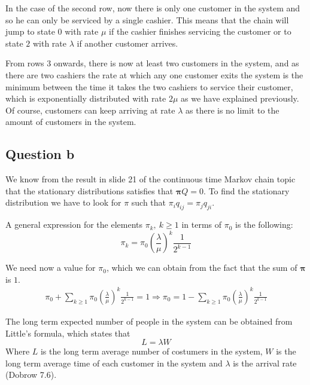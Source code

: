 \documentclass[11pt, a4paper]{article}
\begin{document}
In the case of the second row, now there is only one customer in the system and so he can only be serviced by a single cashier. This means that the chain will jump to state $0$ with rate $\mu$ if the cashier finishes servicing the customer or to state $2$ with rate $\lambda$ if another customer arrives.

From rows $3$ onwards, there is now at least two customers in the system, and as there are two cashiers the rate at which any one customer exits the system is the minimum between the time it takes the two cashiers to service their customer, which is exponentially distributed with rate $2\mu$ as we have explained previously.
Of course, customers can keep arriving at rate $\lambda$ as there is no limit to the amount of customers in the system.

\subsection*{Question b}
We know from the result in slide 21 of the continuous time Markov chain topic that the stationary distributions satisfies that $\bm{\pi}Q = 0$.
To find the stationary distribution we have to look for $\pi$ such that $\pi_i q_{ij} = \pi_j q_{ji}$.

A general expression for the elements $\pi_k, \ k\geq 1$ in terms of $\pi_0$ is the following:
\[
	\pi_k = \pi_0\left(\frac{\lambda}{\mu}\right)^k \frac{1}{2^{k-1}}
\]

We need now a value for $\pi_0$, which we can obtain from the fact that the sum of $\bm{\pi}$ is $1$.
\begin{align*}
	\pi_0 + \sum_{k \geq 1}	\pi_0\left(\frac{\lambda}{\mu}\right)^k \frac{1}{2^{k-1}} = 1 \Rightarrow \pi_0 = 1 - \sum_{k \geq 1}	\pi_0\left(\frac{\lambda}{\mu}\right)^k \frac{1}{2^{k-1}}
\end{align*}

The long term expected number of people in the system can be obtained from Little's formula, which states that 
\[
	L = \lambda W
\]
Where $L$ is the long term average number of costumers in the system, $W$ is the long term average time of each customer in the system and $\lambda$ is the arrival rate (Dobrow 7.6).
\end{document}
